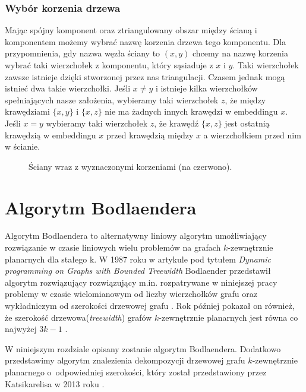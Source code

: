 \documentclass[twoside,a4paper,12pt]{report} %
\theoremstyle{break}
\begin{document}
\subsection{Wybór korzenia drzewa}
Mając spójny komponent oraz ztriangulowany obszar między ścianą i komponentem możemy wybrać nazwę korzenia drzewa tego komponentu. Dla przypomnienia, gdy nazwa węzła ściany to $(x,y)$ chcemy na nazwę korzenia wybrać taki wierzchołek z komponentu, który sąsiaduje z $x$ i $y$. Taki wierzchołek zawsze istnieje dzięki stworzonej przez nas triangulacji. Czasem jednak mogą istnieć dwa takie wierzchołki. Jeśli $x \neq y$ i istnieje kilka wierzchołków spełniających nasze założenia, wybieramy taki wierzchołek $z$, że między krawędziami $\{x,y\}$ i $\{x,z\}$ nie ma żadnych innych krawędzi w embeddingu $x$. Jeśli $x = y$ wybieramy taki wierzchołek $z$, że krawędź $\{x,z\}$ jest ostatnią krawędzią w embeddingu $x$ przed krawędzią między $x$ a wierzchołkiem przed nim w ścianie.

\begin{figure}[ht]
    \centering
    
    \caption{Ściany wraz z wyznaczonymi korzeniami (na czerwono).}
    \label{wyborkorzenia}
\end{figure}


\chapter{Algorytm Bodlaendera} \label{rozdzial_5}
Algorytm Bodlaendera to alternatywny liniowy algorytm umożliwiający rozwiązanie w czasie liniowych wielu problemów na grafach $k$-zewnętrznie planarnych dla stałego k. W 1987 roku w artykule pod tytułem \textit{Dynamic programming on Graphs with Bounded Treewidth} Bodlaender przedstawił algorytm rozwiązujący rozwiązujący m.in. rozpatrywane w niniejszej pracy problemy w czasie wielomianowym od liczby wierzchołków grafu oraz wykładniczym od szerokości drzewowej grafu \cite{bodlaender2}. Rok później pokazał on również, że szerokość drzewowa(\emph{treewidth}) grafów $k$-zewnętrznie planarnych jest równa co najwyżej $3k-1$ \cite{bodlaender1}.

W niniejszym rozdziale opisany zostanie algorytm Bodlaendera. Dodatkowo przedstawimy algorytm znalezienia dekompozycji drzewowej grafu $k$-zewnętrznie planarnego o~odpowiedniej szerokości, który został przedstawiony przez Katsikarelisa w 2013 roku \cite{ioannis}.
\end{document}
